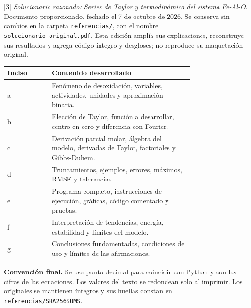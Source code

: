 [3] \textit{Solucionario razonado: Series de Taylor y termodinámica del sistema Fe-Al-O}. Documento proporcionado, fechado el 7 de octubre de 2026. Se conserva sin cambios en la carpeta \texttt{referencias/}, con el nombre \texttt{solucionario\_original.pdf}. Esta edición amplía sus explicaciones, reconstruye sus resultados y agrega código íntegro y desgloses; no reproduce su maquetación original.

\begin{center}\begin{tabular}{lp{0.76\linewidth}}\toprule
Inciso & Contenido desarrollado\\\midrule
a & Fenómeno de desoxidación, variables, actividades, unidades y aproximación binaria.\\
b & Elección de Taylor, función a desarrollar, centro en cero y diferencia con Fourier.\\
c & Derivación parcial molar, álgebra del modelo, derivadas de Taylor, factoriales y Gibbs-Duhem.\\
d & Truncamientos, ejemplos, errores, máximos, RMSE y tolerancias.\\
e & Programa completo, instrucciones de ejecución, gráficas, código comentado y pruebas.\\
f & Interpretación de tendencias, energía, estabilidad y límites del modelo.\\
g & Conclusiones fundamentadas, condiciones de uso y límites de las afirmaciones.\\\bottomrule
\end{tabular}\end{center}

\textbf{Convención final.} Se usa punto decimal para coincidir con Python y con las cifras de las ecuaciones. Los valores del texto se redondean solo al imprimir. Los originales se mantienen íntegros y sus huellas constan en \texttt{referencias/SHA256SUMS}.
